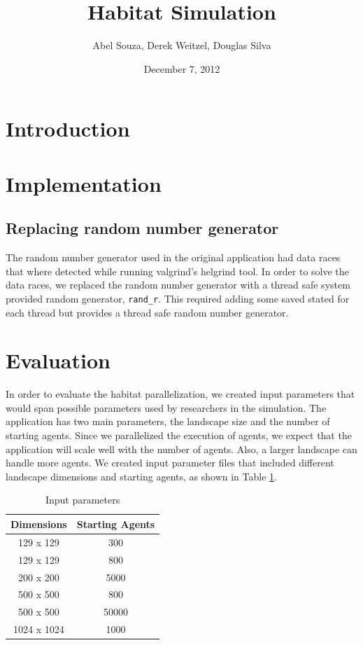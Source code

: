 \documentclass[12pt, notitlepage]{article}
\begin{document}
\title{Habitat Simulation}
\author{Abel Souza, Derek Weitzel, Douglas Silva}
\date{December 7, 2012}

\maketitle

\section{Introduction}

\section{Implementation}


\subsection{Replacing random number generator}
The random number generator used in the original application had data races that where detected while running valgrind's helgrind tool.  In order to solve the data races, we replaced the random number generator with a thread safe system provided random generator, \texttt{rand\_r}.  This required adding some saved stated for each thread but provides a thread safe random number generator.  


\section{Evaluation}

In order to evaluate the habitat parallelization, we created input parameters that would span possible parameters used by researchers in the simulation.  The application has two main parameters, the landscape size and the number of starting agents.  Since we parallelized the execution of agents, we expect that the application will scale well with the number of agents.  Also, a larger landscape can handle more agents.  We created input parameter files that included different landscape dimensions and starting agents, as shown in Table \ref{tab:parameters}.

\begin{table}[ht]
\centering
\begin{tabular}{ c | c }
\textbf{Dimensions} & \textbf{Starting Agents} \\ 
\hline \hline
129 x 129 & 300 \\
129 x 129 & 800 \\
200 x 200 & 5000 \\
500 x 500 & 800 \\
500 x 500 & 50000 \\
1024 x 1024 & 1000
\end{tabular}
\caption{Input parameters} \label{tab:parameters}
\end{table}
\end{document}
